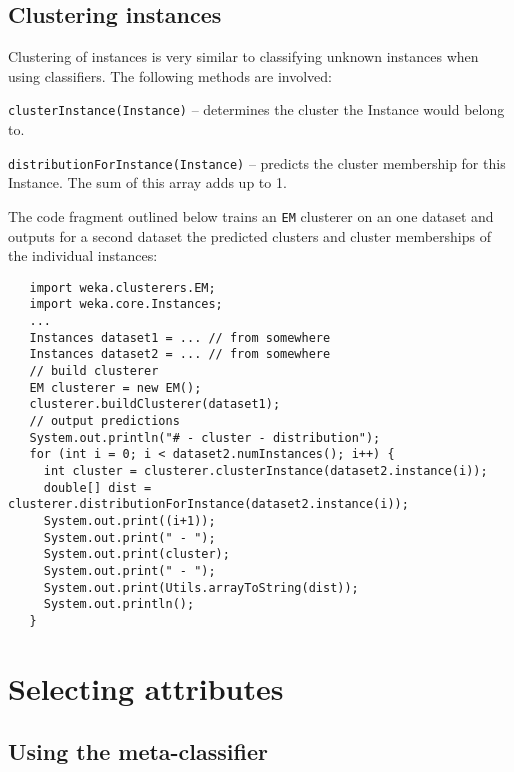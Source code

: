 \subsection{Clustering instances}
Clustering of instances is very similar to classifying unknown instances when
using classifiers. The following methods are involved:
\begin{tight_itemize}
	\item \texttt{clusterInstance(Instance)} -- determines the cluster the
Instance would belong to.
	\item \texttt{distributionForInstance(Instance)} -- predicts the cluster
membership for this Instance. The sum of this array adds up to 1.
\end{tight_itemize}
The code fragment outlined below trains an \texttt{EM} clusterer on an one
dataset and outputs for a second dataset the predicted clusters and cluster
memberships of the individual instances:
\begin{verbatim}
   import weka.clusterers.EM;
   import weka.core.Instances;
   ...
   Instances dataset1 = ... // from somewhere
   Instances dataset2 = ... // from somewhere
   // build clusterer
   EM clusterer = new EM();
   clusterer.buildClusterer(dataset1);
   // output predictions
   System.out.println("# - cluster - distribution");
   for (int i = 0; i < dataset2.numInstances(); i++) {
     int cluster = clusterer.clusterInstance(dataset2.instance(i));
     double[] dist = clusterer.distributionForInstance(dataset2.instance(i));
     System.out.print((i+1));
     System.out.print(" - ");
     System.out.print(cluster);
     System.out.print(" - ");
     System.out.print(Utils.arrayToString(dist));
     System.out.println();
   }
\end{verbatim}

\newpage

\section{Selecting attributes}

\subsection{Using the meta-classifier}

